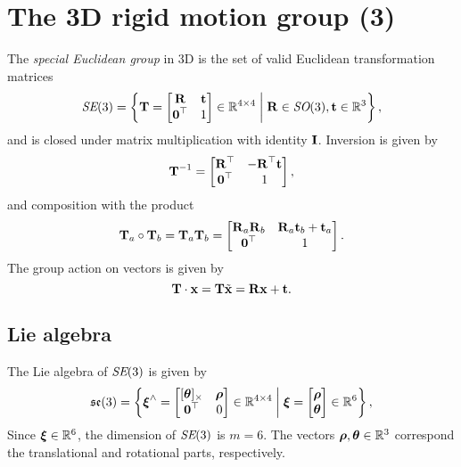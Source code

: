 \section{The 3D rigid motion group \SE(3)} \label{sec:SE3_group}
The \emph{special Euclidean group} in 3D is the set of valid Euclidean transformation matrices
\begin{equation}
  \SE(3) = \left \{ \matT =
  \begin{bmatrix}
    \matR & \vect\\
    \matr{0}\trans & 1
  \end{bmatrix}
  \in \bbR^{4 \times 4} \;\middle|\; \matR \in \SO(3), \vect \in \bbR^3 \right \},
\end{equation}
and is closed under matrix multiplication with identity $\matI$.
Inversion is given by
\begin{equation}
  \matT^{-1} = 
  \begin{bmatrix}
    \matR\trans & -\matR\trans \vect\\
    \matr{0}\trans & 1
  \end{bmatrix},
\end{equation}
and composition with the product
\begin{equation}
  \matT_a \circ \matT_b = \matT_a \matT_b = 
  \begin{bmatrix}
    \matR_a \matR_b & \matR_a \vect_b + \vect_a\\
    \matr{0}\trans & 1
  \end{bmatrix}.
\end{equation}
The group action on vectors is given by
\begin{equation} \label{eq:SE3-group-action}
  \matT \cdot \vecx = \matT \tilde{\vecx} = \matR \vecx + \vect.
\end{equation}


\subsection{Lie algebra}
The Lie algebra of $\SE(3)$ is given by
\begin{equation}
  \se(3) = \left \{ \vecxi^\wedge = 
  \begin{bmatrix}
    [\vectheta]_\times & \vecrho\\
    \matr{0}\trans & 0
  \end{bmatrix}
  \in \bbR^{4 \times 4} \;\middle|\; \vecxi =
  \begin{bmatrix}
    \vecrho\\
    \vectheta
  \end{bmatrix}  
  \in \bbR^6 \right \},
\end{equation}
Since $\vecxi \in \bbR^6$, the dimension of $\SE(3)$ is $m = 6$.
The vectors $\vecrho, \vectheta \in \bbR^3$ correspond the translational and rotational parts, respectively.

